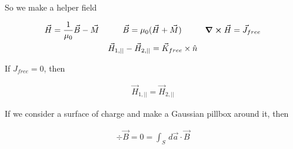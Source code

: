 \documentclass[fleqn]{report}
\newcommand{\hp}{\hspace{1cm}}
\newcommand{\equations} [1] {
\begin{gather*}
#1
\end{gather*}
}
\begin{document}
So we make a helper field 

\equations{
    \vec H
    =
    \frac{1}{\mu_0}
    \vec B 
    -
    \vec M
    \hp 
    \vec B 
    =
    \mu_0 
    (\vec H + \vec M)
    \hp 
    \curl \vec H = \vec J_{free}
    \\
    \vec H_{1, ||}
    -
    \vec H_{2, ||}
    =
    \vec K_{free} \times \hat n
}

If $J_{free} = 0$, then 

\equations{
    \vec H_{1, ||}
    =
    \vec H_{2, ||}
}

If we consider a surface of charge and make a Gaussian pillbox around it, then 
\equations{
    \div \vec B 
    =
    0
    =
    \int_S \, d \vec a \cdot 
    \vec B 
}
\end{document}
